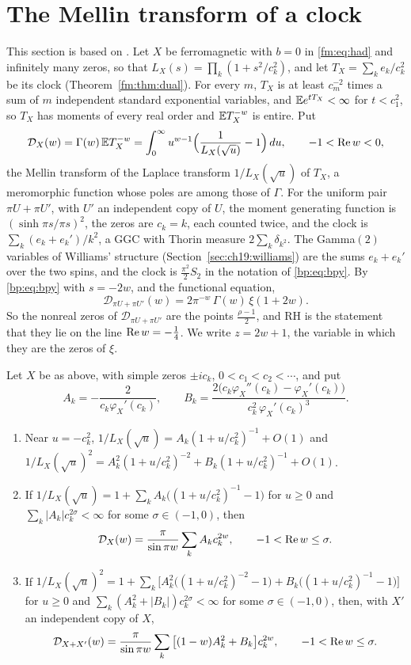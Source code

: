 \section{The Mellin transform of a clock}\label{ch:fmmellin}

This section is based on \cite{P26tus,P26lyzeta}. Let $X$ be ferromagnetic with $b=0$ in \eqref{fm:eq:had} and infinitely many zeros, so that $L_X(s)=\prod_k(1+s^2/c_k^2)$, and let $T_X=\sum_ke_k/c_k^2$ be its clock (Theorem~\ref{fm:thm:dual}). For every $m$, $T_X$ is at least $c_m^{-2}$ times a sum of $m$ independent standard exponential variables, and $\mathbb{E} e^{tT_X}<\infty$ for $t<c_1^2$, so $T_X$ has moments of every real order and $\mathbb{E} T_X^{-w}$ is entire. Put
\[
\mathcal D_X(w)=\Gamma(w)\,\mathbb{E} T_X^{-w}=\int_0^\infty u^{w-1}\Big(\frac1{L_X(\sqrt u)}-1\Big)\,du,\qquad -1<\operatorname{Re} w<0,
\]
the Mellin transform of the Laplace transform $1/L_X(\sqrt u)$ of $T_X$, a meromorphic function whose poles are among those of $\Gamma$. For the uniform pair $\pi U+\pi U'$, with $U'$ an independent copy of $U$, the moment generating function is $(\sinh\pi s/\pi s)^2$, the zeros are $c_k=k$, each counted twice, and the clock is $\sum_k(e_k+e_k')/k^2$, a GGC with Thorin measure $2\sum_k\delta_{k^2}$. The Gamma$(2)$ variables of Williams' structure (Section~\ref{sec:ch19:williams}) are the sums $e_k+e_k'$ over the two spins, and the clock is $\frac{\pi^2}2S_2$ in the notation of \eqref{bp:eq:bpy}. By \eqref{bp:eq:bpy} with $s=-2w$, and the functional equation,
\begin{equation}\label{fm:eq:Dpair}
\mathcal D_{\pi U+\pi U'}(w)=2\pi^{-w}\,\Gamma(w)\,\xi(1+2w).
\end{equation}
So the nonreal zeros of $\mathcal D_{\pi U+\pi U'}$ are the points $\frac{\rho-1}2$, and RH is the statement that they lie on the line $\operatorname{Re} w=-\frac14$. We write $z=2w+1$, the variable in which they are the zeros of $\xi$.

\begin{proposition}\label{fm:prop:residue}
Let $X$ be as above, with simple zeros $\pm ic_k$, $0<c_1<c_2<\cdots$, and put
\[
A_k=-\frac2{c_k\varphi_X'(c_k)},\qquad B_k=\frac{2\big(c_k\varphi_X''(c_k)-\varphi_X'(c_k)\big)}{c_k^2\,\varphi_X'(c_k)^3}.
\]
\begin{enumerate}
\item[(i)] Near $u=-c_k^2$, $1/L_X(\sqrt u)=A_k(1+u/c_k^2)^{-1}+O(1)$ and $1/L_X(\sqrt u)^2=A_k^2(1+u/c_k^2)^{-2}+B_k(1+u/c_k^2)^{-1}+O(1)$.
\item[(ii)] If $1/L_X(\sqrt u)=1+\sum_kA_k\big((1+u/c_k^2)^{-1}-1\big)$ for $u\ge0$ and $\sum_k|A_k|c_k^{2\sigma}<\infty$ for some $\sigma\in(-1,0)$, then
\[
\mathcal D_X(w)=\frac\pi{\sin\pi w}\sum_kA_kc_k^{2w},\qquad -1<\operatorname{Re} w\le\sigma .
\]
\item[(iii)] If $1/L_X(\sqrt u)^2=1+\sum_k\big[A_k^2\big((1+u/c_k^2)^{-2}-1\big)+B_k\big((1+u/c_k^2)^{-1}-1\big)\big]$ for $u\ge0$ and $\sum_k(A_k^2+|B_k|)c_k^{2\sigma}<\infty$ for some $\sigma\in(-1,0)$, then, with $X'$ an independent copy of $X$,
\[
\mathcal D_{X+X'}(w)=\frac\pi{\sin\pi w}\sum_k\big[(1-w)A_k^2+B_k\big]c_k^{2w},\qquad -1<\operatorname{Re} w\le\sigma .
\]
\end{enumerate}
\end{proposition}

